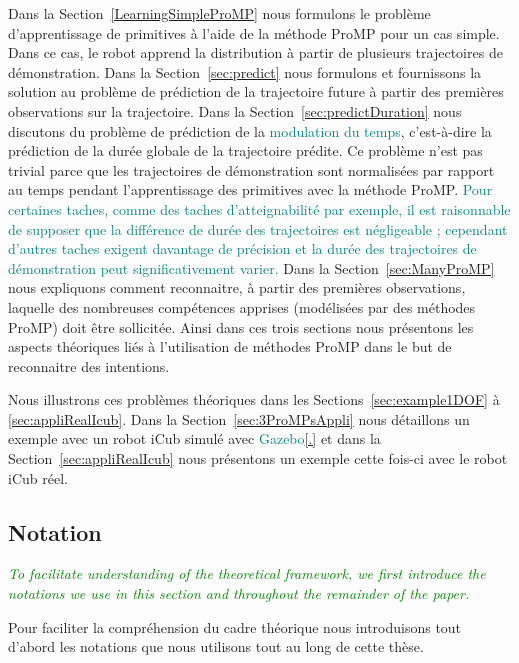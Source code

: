 \documentclass[utf8]{frontiersSCNS} %
\newcommand{\toimprove}[1]{\textcolor{teal}{#1}}
\newcommand{\quest}[1]{\textcolor{green}{\textit{#1}}}
\begin{document}
Dans la Section~\ref{LearningSimpleProMP} nous formulons le problème d'apprentissage de primitives à l'aide de la méthode ProMP pour un cas simple. Dans ce cas, le robot apprend la distribution à partir de plusieurs trajectoires de démonstration. Dans la Section~\ref{sec:predict} nous formulons et fournissons la solution au problème de prédiction de la trajectoire \og future \fg{} à partir des premières observations sur la trajectoire.
Dans la Section~\ref{sec:predictDuration} nous discutons du problème de prédiction de la \toimprove{modulation du temps}, c'est-à-dire la prédiction de la durée globale de la trajectoire prédite. Ce problème n'est pas trivial parce que les trajectoires de démonstration sont \og normalisées \fg{} par rapport au temps pendant l'apprentissage des primitives avec la méthode ProMP. \toimprove{Pour certaines taches, comme des taches d'atteignabilité par exemple, il est raisonnable de supposer que la différence de durée des trajectoires est négligeable ; cependant d'autres taches \toimprove{exigent davantage de précision et} la durée des trajectoires de démonstration peut significativement varier.}
Dans la Section~\ref{sec:ManyProMP} nous expliquons comment reconnaitre, à partir des premières observations, laquelle des nombreuses compétences apprises (modélisées par des méthodes ProMP) doit être sollicitée.
Ainsi dans ces trois sections nous présentons les aspects théoriques liés à l'utilisation de méthodes ProMP dans le but de reconnaitre des intentions.

Nous illustrons ces problèmes théoriques dans les Sections~\ref{sec:example1DOF} à \ref{sec:appliRealIcub}. Dans la Section~\ref{sec:3ProMPsAppli} nous détaillons un exemple avec un robot iCub simulé avec \toimprove{Gazebo\ref{.}} et dans la Section~\ref{sec:appliRealIcub} nous présentons un exemple cette fois-ci avec le robot iCub réel.


\subsection{Notation}\label{sec:notation}

\quest{To facilitate understanding of the theoretical framework, we first introduce the notations we use in this section and throughout the remainder of the paper.}

Pour faciliter la compréhension du cadre théorique nous introduisons tout d'abord les notations que nous utilisons tout au long de cette thèse.
\end{document}
